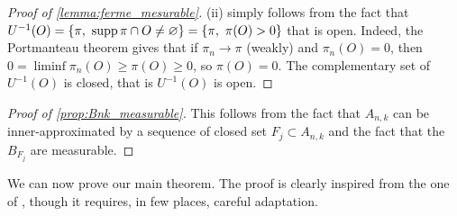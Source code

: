 \begin{proof}[Proof of \cref{lemma:ferme_mesurable}]
(ii) simply follows from the fact that $U^{-1}(O) = \{ \pi,\ \operatorname{supp}\pi \cap O \neq \varnothing \} = \{ \pi,\ \pi(O) > 0 \}$ that is open. Indeed, the Portmanteau theorem gives that if $\pi_n \to \pi$ (weakly) and $\pi_n(O) = 0$, then $0 = \liminf \pi_n(O) \geq \pi(O) \geq 0$, so $\pi(O) = 0$. The complementary set of $U^{-1}(O)$ is closed, that is $U^{-1}(O)$ is open.
\end{proof}

\begin{proof}[Proof of \cref{prop:Bnk_measurable}]
This follows from the fact that $A_{n,k}$ can be inner-approximated by a sequence of closed set $F_j \subset A_{n,k}$ and the fact that the $B_{F_j}$ are measurable.
\end{proof}

We can now prove our main theorem. The proof is clearly inspired from the one of \cite{fontbona2010measurability}, though it requires, in few places, careful adaptation.


